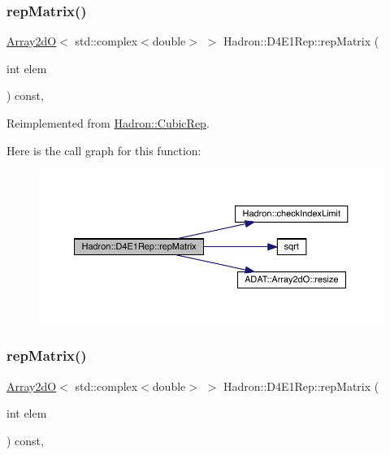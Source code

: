 \subsubsection{\texorpdfstring{repMatrix()}{repMatrix()}\hspace{0.1cm}{\footnotesize\ttfamily [1/2]}}
{\footnotesize\ttfamily \mbox{\hyperlink{classADAT_1_1Array2dO}{Array2dO}}$<$ std\+::complex$<$double$>$ $>$ Hadron\+::\+D4\+E1\+Rep\+::rep\+Matrix (\begin{DoxyParamCaption}\item[{int}]{elem }\end{DoxyParamCaption}) const\hspace{0.3cm}{\ttfamily [inline]}, {\ttfamily [virtual]}}



Reimplemented from \mbox{\hyperlink{structHadron_1_1CubicRep_ac5d7e9e6f4ab1158b5fce3e4ad9e8005}{Hadron\+::\+Cubic\+Rep}}.

Here is the call graph for this function\+:
\nopagebreak
\begin{figure}[H]
\begin{center}
\leavevmode
\includegraphics[width=350pt]{da/d78/structHadron_1_1D4E1Rep_a8a0fcfa06e2a36d6835bab2431654a2f_cgraph}
\end{center}
\end{figure}
\mbox{\label{structHadron_1_1D4E1Rep_a8a0fcfa06e2a36d6835bab2431654a2f}} 
\subsubsection{\texorpdfstring{repMatrix()}{repMatrix()}\hspace{0.1cm}{\footnotesize\ttfamily [2/2]}}
{\footnotesize\ttfamily \mbox{\hyperlink{classADAT_1_1Array2dO}{Array2dO}}$<$ std\+::complex$<$double$>$ $>$ Hadron\+::\+D4\+E1\+Rep\+::rep\+Matrix (\begin{DoxyParamCaption}\item[{int}]{elem }\end{DoxyParamCaption}) const\hspace{0.3cm}{\ttfamily [inline]}, {\ttfamily [virtual]}}



